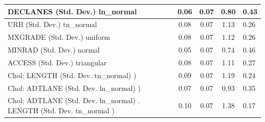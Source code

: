 \begin{table}
\begin{center}
\begin{tabular}{|l|l|c|c|c|l|}
			\hline
			DECLANES (Std. Dev.) ln_normal &  & 0.06 & 0.07 & 0.80 & 0.43 \\
			\hline
			URB (Std. Dev.) tn_normal &  & 0.08 & 0.07 & 1.13 & 0.26 \\
			\hline
			MXGRADE (Std. Dev.) uniform &  & 0.08 & 0.07 & 1.12 & 0.26 \\
			\hline
			MINRAD (Std. Dev.) normal &  & 0.05 & 0.07 & 0.74 & 0.46 \\
			\hline
			ACCESS (Std. Dev.) triangular &  & 0.08 & 0.07 & 1.11 & 0.27 \\
			\hline
			 Chol: LENGTH (Std. Dev. tn_normal) ) &  & 0.09 & 0.07 & 1.19 & 0.24 \\
			\hline
			 Chol: ADTLANE (Std. Dev. ln_normal) ) &  & 0.07 & 0.07 & 0.93 & 0.35 \\
			\hline
			 Chol: ADTLANE (Std. Dev. ln_normal) . LENGTH (Std. Dev.   tn_normal ) &  & 0.10 & 0.07 & 1.38 & 0.17 \\
			\hline
		\end{tabular}
	\end{center}
\end{table}